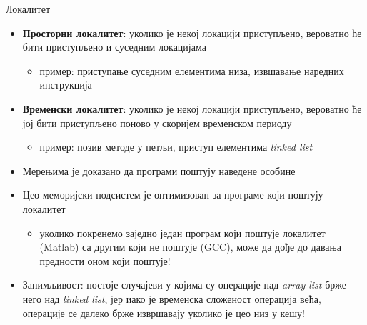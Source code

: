 \documentclass[xcolor=table]{beamer}
\begin{document}
    \begin{frame}[allowframebreaks]{Локалитет}
        \begin{itemize}
            \item \textbf{Просторни локалитет}: уколико је некој локацији приступљено, вероватно ће бити приступљено и суседним локацијама
            \begin{itemize}
                \item пример: приступање суседним елементима низа, извшавање наредних инструкција
            \end{itemize}
            \item \textbf{Временски локалитет}: уколико је некој локацији приступљено, вероватно ће јој бити приступљено поново у скоријем временском периоду
            \begin{itemize}
                \item пример: позив методе у петљи, приступ елементима \textit{linked list}
            \end{itemize}
            \item Мерењима је доказано да програми поштују наведене особине
        \end{itemize}
        
        \framebreak

        \begin{itemize} 
            \item Цео меморијски подсистем је оптимизован за програме који поштују локалитет
            \begin{itemize}
                \item уколико покренемо заједно један програм који поштује локалитет (Matlab) са другим који не поштује (GCC), може да дође до давања предности оном који поштује! 
            \end{itemize}
            \item Занимљивост: постоје случајеви у којима су операције над \textit{array list} брже него над \textit{linked list}, јер иако је временска сложеност операција већа, операције се далеко брже извршавају уколико је цео низ у кешу!
        \end{itemize}
    \end{frame}
    
\end{document}
